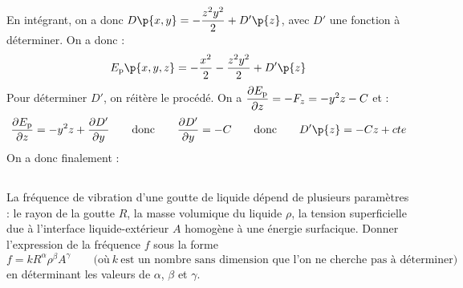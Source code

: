 \begin{enumerate}
{            %
            En intégrant, on a donc $D\p{x, y} = -\dfrac{z^2y^2}{2} + D'\p{z}$, avec $D'$ une fonction à déterminer. On a donc :
            \[ E_\text p\p{x, y, z} = -\dfrac{x^2}{2} - \dfrac{z^2y^2}{2} + D'\p{z}\]
            Pour déterminer $D'$, on réitère le procédé. On a $\dfrac{\partial E_\text p}{\partial z} = -F_z = -y^2z - C$ et :
            \[ \dfrac{\partial E_\text p}{\partial z} = -y^2z + \dfrac{\partial D'}{\partial y} \qquad\text{donc}\qquad \dfrac{\partial D'}{\partial y} = -C \qquad\text{donc}\qquad D'\p{z} = -Cz + cte\]
            On a donc finalement :
        }
        \yesafter
        \boxansconc{
            \[ E_\text p\p{x, y, z} = - cZ - \dfrac{x^2 + y^2z^2}{2} + cte\]
        }
        \yesbefore
    \end{enumerate}

    \subsection{}
    
    La fréquence de vibration d'une goutte de liquide dépend de plusieurs paramètres : le rayon de la goutte $R$, la masse volumique du liquide $\rho$, la tension superficielle due à l'interface liquide-extérieur $A$ homogène à une énergie surfacique. Donner l'expression de la fréquence $f$ sous la forme
    \[ f = kR^\alpha \rho^\beta A^\gamma \qquad\text{(où} \ k \ \text{est un nombre sans dimension que l'on ne cherche pas à déterminer)}\]
    en déterminant les valeurs de $\alpha$, $\beta$ et $\gamma$.
    
    \noafter
    \nobefore\yesafter
    \boxansconc{
        \[ f = k\sqrt{\dfrac{A}{\rho R^3}}\]
    }
    \yesbefore
    
